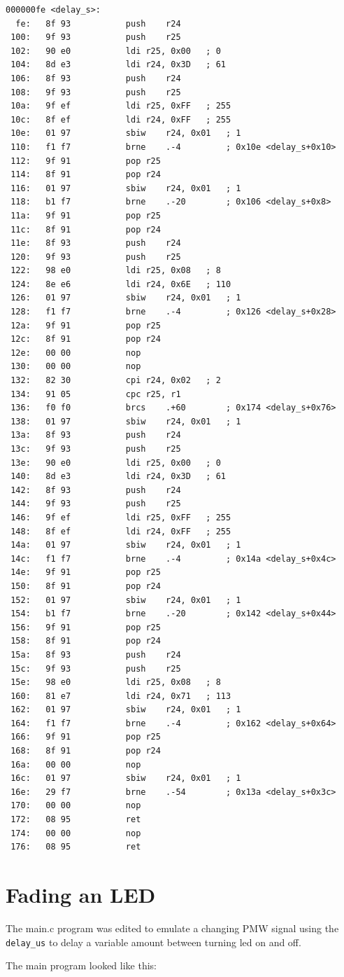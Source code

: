 \documentclass{article}
\begin{document}
\begin{verbatim}
000000fe <delay_s>:
  fe:	8f 93       	push	r24
 100:	9f 93       	push	r25
 102:	90 e0       	ldi	r25, 0x00	; 0
 104:	8d e3       	ldi	r24, 0x3D	; 61
 106:	8f 93       	push	r24
 108:	9f 93       	push	r25
 10a:	9f ef       	ldi	r25, 0xFF	; 255
 10c:	8f ef       	ldi	r24, 0xFF	; 255
 10e:	01 97       	sbiw	r24, 0x01	; 1
 110:	f1 f7       	brne	.-4      	; 0x10e <delay_s+0x10>
 112:	9f 91       	pop	r25
 114:	8f 91       	pop	r24
 116:	01 97       	sbiw	r24, 0x01	; 1
 118:	b1 f7       	brne	.-20     	; 0x106 <delay_s+0x8>
 11a:	9f 91       	pop	r25
 11c:	8f 91       	pop	r24
 11e:	8f 93       	push	r24
 120:	9f 93       	push	r25
 122:	98 e0       	ldi	r25, 0x08	; 8
 124:	8e e6       	ldi	r24, 0x6E	; 110
 126:	01 97       	sbiw	r24, 0x01	; 1
 128:	f1 f7       	brne	.-4      	; 0x126 <delay_s+0x28>
 12a:	9f 91       	pop	r25
 12c:	8f 91       	pop	r24
 12e:	00 00       	nop
 130:	00 00       	nop
 132:	82 30       	cpi	r24, 0x02	; 2
 134:	91 05       	cpc	r25, r1
 136:	f0 f0       	brcs	.+60     	; 0x174 <delay_s+0x76>
 138:	01 97       	sbiw	r24, 0x01	; 1
 13a:	8f 93       	push	r24
 13c:	9f 93       	push	r25
 13e:	90 e0       	ldi	r25, 0x00	; 0
 140:	8d e3       	ldi	r24, 0x3D	; 61
 142:	8f 93       	push	r24
 144:	9f 93       	push	r25
 146:	9f ef       	ldi	r25, 0xFF	; 255
 148:	8f ef       	ldi	r24, 0xFF	; 255
 14a:	01 97       	sbiw	r24, 0x01	; 1
 14c:	f1 f7       	brne	.-4      	; 0x14a <delay_s+0x4c>
 14e:	9f 91       	pop	r25
 150:	8f 91       	pop	r24
 152:	01 97       	sbiw	r24, 0x01	; 1
 154:	b1 f7       	brne	.-20     	; 0x142 <delay_s+0x44>
 156:	9f 91       	pop	r25
 158:	8f 91       	pop	r24
 15a:	8f 93       	push	r24
 15c:	9f 93       	push	r25
 15e:	98 e0       	ldi	r25, 0x08	; 8
 160:	81 e7       	ldi	r24, 0x71	; 113
 162:	01 97       	sbiw	r24, 0x01	; 1
 164:	f1 f7       	brne	.-4      	; 0x162 <delay_s+0x64>
 166:	9f 91       	pop	r25
 168:	8f 91       	pop	r24
 16a:	00 00       	nop
 16c:	01 97       	sbiw	r24, 0x01	; 1
 16e:	29 f7       	brne	.-54     	; 0x13a <delay_s+0x3c>
 170:	00 00       	nop
 172:	08 95       	ret
 174:	00 00       	nop
 176:	08 95       	ret
\end{verbatim}

\section{Fading an LED}
The main.c program was edited to emulate a changing PMW signal using the \verb"delay_us" to delay a variable amount between turning led on and off.

The main program looked like this:
\end{document}
